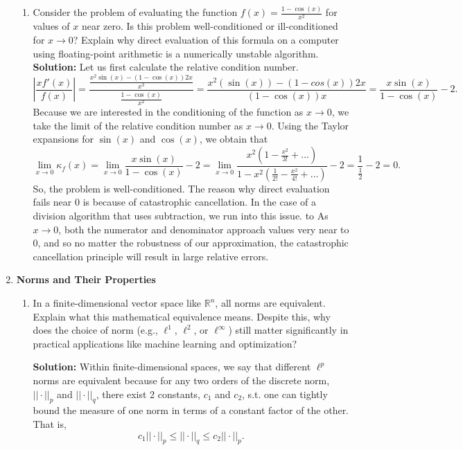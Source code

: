 \documentclass{article}
\theoremstyle{definition}
\theoremstyle{remark}
\begin{document}
\begin{enumerate}
\begin{enumerate}
        \item Consider the problem of evaluating the function $f(x) = \frac{1-\cos(x)}{x^2}$ for values of $x$ near zero. Is this problem well-conditioned or ill-conditioned for $x \to 0$? Explain why direct evaluation of this formula on a computer using floating-point arithmetic is a numerically unstable algorithm.\\

        \textbf{Solution:} Let us first calculate the relative condition number.
        \[
            \left|\frac{xf'(x)}{f(x)}\right| = \frac{\frac{x^{2}\sin(x)-(1-\cos(x))2x}{x^{3}}}{\frac{1-\cos(x)}{x^{2}}} = \frac{x^{2}(\sin(x))-(1-cos(x))2x}{(1-\cos(x))x} = \frac{x\sin(x)}{1-\cos(x)} -2  
        .\]
        Because we are interested in the conditioning of the function as \(x\to 0\), we take the limit of the relative condition number as \(x\to0\). Using the Taylor expansions for \(\sin(x)\) and \(\cos(x)\), we obtain that
        \[
            \lim_{ x \to 0 } \kappa_{f}(x) = \lim_{ x \to 0 } \frac{x\sin(x)}{1-\cos(x)} -2= \lim_{ x \to 0 } \frac{x^{2}\left(1 - \frac{x^{2}}{3!}+\dots\right)}{ 1-x^{2}\left(\frac{1}{2!}-\frac{x^{2}}{4!}+\dots\right)}-2 = \frac{1}{\frac{1}{2}} - 2 = 0
        .\]
        So, the problem is well-conditioned. The reason why direct evaluation fails near 0 is because of catastrophic cancellation. In the case of a division algorithm that uses subtraction, we run into this issue. to  As \(x\to 0\), both the numerator and denominator approach values very near to 0, and so no matter the robustness of our approximation, the catastrophic cancellation principle will result in large relative errors.
    \end{enumerate}

    \item \textbf{Norms and Their Properties}
    \begin{enumerate}
        \item In a finite-dimensional vector space like $\mathbb{R}^n$, all norms are equivalent. Explain what this mathematical equivalence means. Despite this, why does the choice of norm (e.g., $\ell^1$, $\ell^2$, or $\ell^\infty$) still matter significantly in practical applications like machine learning and optimization?

        \textbf{Solution:} Within finite-dimensional spaces, we say that different \(\ell^{p}\) norms are equivalent because for any two orders of the discrete norm, \(||\cdot||_{p}\) and \(||\cdot||_{q}\), there exist 2 constants, \(c_{1}\) and \(c_{2}\), s.t. one can tightly bound the measure of one norm in terms of a constant factor of the other. That is,
        \[
            c_{1}||\cdot||_{p} \leq ||\cdot||_{q} \leq c_{2} ||\cdot||_{p}
        .\]


\end{enumerate}
\end{enumerate}
\end{document}

